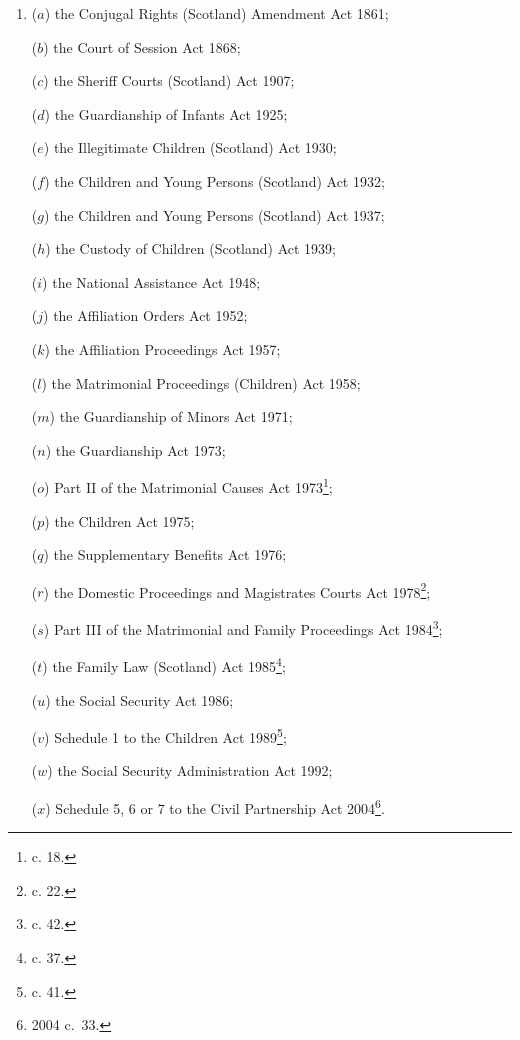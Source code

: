\documentclass[12pt,a4paper]{article}
\begin{document}
\begin{enumerate}\item[]
($a$) the Conjugal Rights (Scotland) Amendment Act 1861;

($b$) the Court of Session Act 1868;

($c$) the Sheriff Courts (Scotland) Act 1907;

($d$) the Guardianship of Infants Act 1925;

($e$) the Illegitimate Children (Scotland) Act 1930;

($f$) the Children and Young Persons (Scotland) Act 1932;

($g$) the Children and Young Persons (Scotland) Act 1937;

($h$) the Custody of Children (Scotland) Act 1939;

($i$) the National Assistance Act 1948;

($j$) the Affiliation Orders Act 1952;

($k$) the Affiliation Proceedings Act 1957;

($l$) the Matrimonial Proceedings (Children) Act 1958;

($m$) the Guardianship of Minors Act 1971;

($n$) the Guardianship Act 1973;

($o$) Part II of the Matrimonial Causes Act 1973\footnote{ c. 18.};

($p$) the Children Act 1975;

($q$) the Supplementary Benefits Act 1976;

\begin{sloppypar}
($r$) the Domestic Proceedings and Magistrates Courts Act 1978\footnote{ c. 22.};
\end{sloppypar}

($s$) Part III of the Matrimonial and Family Proceedings Act 1984\footnote{ c. 42.};

($t$) the Family Law (Scotland) Act 1985\footnote{ c. 37.};

($u$) the Social Security Act 1986;

($v$) Schedule 1 to the Children Act 1989\footnote{ c. 41.};

($w$) the Social Security Administration Act 1992;

($x$) Schedule 5, 6 or 7 to the Civil Partnership Act 2004\footnote{2004 c.\ 33.}.
\end{enumerate}
\end{document}
